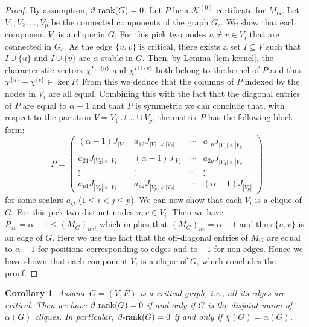 \documentclass[11pt]{article}
\newtheorem{coro}[theorem]{Corollary}
\newcommand{\kzeroc}{\MK^{(0)}\text{-certificate}}
\numberwithin{equation}{section}
\newcommand{\MK}{{\mathcal K}}
\newcommand{\rrank}{\vartheta\text{\rm -rank}}
\begin{document}
\begin{proof}
By assumption, $\rrank(G)=0$. Let $P$ be a $\kzeroc$ for $M_G$. Let $V_1, V_2, \dots, V_p$ be the connected components of the graph $G_c$.
We show that each component $V_i$  is a clique in $G$. For this pick two nodes $u\ne v\in V_i$ that are connected in $G_c$.  As the edge $\{u,v\}$ is  critical, there exists a set $I\subseteq V$ such that $I\cup\{u\}$ and $I\cup \{v\}$ are $\alpha$-stable in $G$. 
Then, by Lemma \ref{lem-kernel}, the characteristic vectors $\chi^{I\cup\{u\}}$ and $\chi^{I\cup\{v\}}$ both belong to the kernel of $P$ and thus
$\chi^{\{u\}}-\chi^{\{v\}}\in \ker P$. From this we deduce that the columns of $P$ indexed by the nodes in  $V_i$ are all equal. 
Combining this with  the fact that  the diagonal entries of $P$ are equal to $\alpha -1$ and that $P$ is symmetric we can conclude that, with respect to the partition $V=V_1\cup\ldots \cup V_p$, the matrix $P$ has the following block-form:
        \begin{equation}\label{eqP}
    P=
\begin{pmatrix}
(\alpha -1)J_{|V_1|} & a_{12}J_{|V_1|\times |V_2|} & \cdots & a_{1p}J_{|V_1|\times|V_p| } \\
a_{21}J_{|V_2|\times |V_1|} & (\alpha -1)J_{|V_2|}& \cdots & a_{2p}J_{|V_2|\times |V_p|} \\
\vdots  & \vdots  & \ddots & \vdots  \\
a_{p1}J_{|V_p|\times |V_1|} & a_{p2}J_{|V_p|\times |V_2|} & \cdots & (\alpha-1)J_{|V_p|} 
\end{pmatrix}
\end{equation}
 for some scalars $a_{ij}$ ($1\le i<j\le p$).
We can now show that each $V_i$ is a clique of $G$. For this pick two distinct nodes $u,v\in V_i$. Then we have $P_{uv}=\alpha -1\le (M_G)_{uv}$, which implies that $(M_G)_{uv}=\alpha-1$ and thus $\{u,v\}$ is an edge of $G$. Here we use the fact that the off-diagonal entries of $M_G$ are equal to $\alpha-1$ for positions corresponding to edges and to $-1$ for non-edges. Hence we have shown that  each component $V_i$ is a clique of $G$, which concludes the proof.
\end{proof}

\begin{coro}\label{cor-critical_rank_0}
Assume  $G=(V,E)$ is a critical graph, i.e., all its edges are critical.   Then we have 
 $\rrank(G)=0$ if and only if $G$ is  the disjoint union of $\alpha(G)$ cliques. In particular, $\rrank(G)=0$ if and only if $\overline \chi(G)=\alpha (G)$.
\end{coro}
\end{document}
